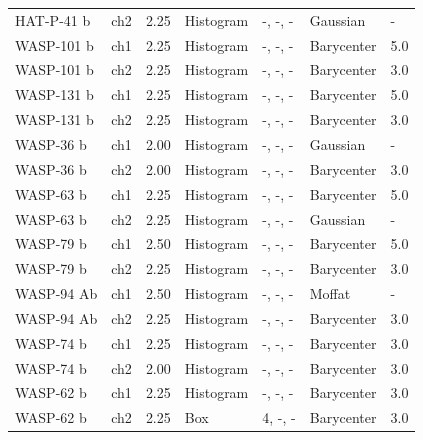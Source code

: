 \begin{subappendices}
{\begin{landscape}
\begin{longtable}{lllllll}
  HAT-P-41 b  &     ch2 &           2.25 &         Histogram &   -, -, -  &           Gaussian &                 - \\
  WASP-101 b &     ch1 &           2.25 &         Histogram &   -, -, -  &         Barycenter &                 5.0 \\
  WASP-101 b &     ch2 &           2.25 &         Histogram &   -, -, -  &         Barycenter &                 3.0 \\
  WASP-131 b &     ch1 &           2.25 &         Histogram &   -, -, -  &         Barycenter &                 5.0 \\
  WASP-131 b &     ch2 &           2.25 &         Histogram &   -, -, -  &         Barycenter &                 3.0 \\
  WASP-36 b  &     ch1 &           2.00 &         Histogram &   -, -, -  &           Gaussian &                 - \\
  WASP-36 b  &     ch2 &           2.00 &         Histogram &   -, -, -  &         Barycenter &                 3.0 \\
  WASP-63 b  &     ch1 &           2.25 &         Histogram &   -, -, -  &         Barycenter &                 5.0 \\
  WASP-63 b  &     ch2 &           2.25 &         Histogram &   -, -, -  &           Gaussian &                 - \\
  WASP-79 b  &     ch1 &           2.50 &         Histogram &   -, -, -  &         Barycenter &                 5.0 \\
  WASP-79 b  &     ch2 &           2.25 &         Histogram &   -, -, -  &         Barycenter &                 3.0 \\
  WASP-94 Ab &     ch1 &           2.50 &         Histogram &   -, -, -  &             Moffat &                 - \\
  WASP-94 Ab &     ch2 &           2.25 &         Histogram &   -, -, -  &         Barycenter &                 3.0 \\
  WASP-74 b  &     ch1 &           2.25 &         Histogram &   -, -, -  &         Barycenter &                 3.0 \\
  WASP-74 b  &     ch2 &           2.00 &         Histogram &   -, -, -  &         Barycenter &                 3.0 \\
  WASP-62 b  &     ch1 &           2.25 &         Histogram &   -, -, -  &         Barycenter &                 3.0 \\
  WASP-62 b  &     ch2 &           2.25 &               Box &      4, -, -  &         Barycenter &                 3.0 \\

\end{longtable}
\end{landscape}}
\end{subappendices}
